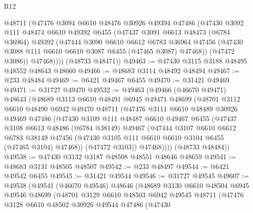 \begin{lexlean}{R12}
\begin{coremodule}
          @48711
          (@47476
            @3094
            @6610
            @48476
            @30926
            @49394
            @47486
            (@47430
              @3092
              @111
              @48474
              @6610
              @49392
              @6455
              (@47437
                @3091
                @6613
                @48473
                (@6784 @36964)
                @49392
                (@47444
                  @3090
                  @6610
                  @6612
                  @6783
                  @36964
                  @47456
                  (@47430 @3088 @111 @6610 @6610 @3087 @6455 (@47465 @3087) @47468))
                (@47472 @3086))
              @47468))))
      (@48733 @48471))
@49463 := @47430 @3115 @3188 @48495 @48552 @48643 @48660
@49466 := @48683 @3114 @48492 @48494
@49467 := @233 @48484
@49469 := @6421 @49467 @6455
@49470 := @31421 @49469
@49471 := @31727 @49470
@49532 := @49463
    (@49466
      (@46670 @49471)
      @48643
      (@48689
        @3113
        @6610
        @48491
        @6945
        @49471
        @48699
        (@48701
          @3112
          @6610
          @48490
          @6942
          @49470
          @48711
          (@47476
            @3111
            @6610
            @48489
            @30926
            @49469
            @47486
            (@47430
              @3109
              @111
              @48487
              @6610
              @49467
              @6455
              (@47437
                @3108
                @6613
                @48486
                (@6784 @38149)
                @49467
                (@47444
                  @3107
                  @6610
                  @6612
                  @6783
                  @38149
                  @47456
                  (@47430 @3105 @111 @6610 @6610 @3104 @6455 (@47465 @3104) @47468))
                (@47472 @3103))
              @47468))))
      (@48733 @48484))
@49538 := @47430 @3132 @3187 @48508 @48551 @48646 @48659
@49541 := @48683 @3131 @48505 @48507
@49542 := @233 @48497
@49544 := @6421 @49542 @6455
@49545 := @31421 @49544
@49546 := @31727 @49545
@49607 := @49538
    (@49541
      (@46670 @49546)
      @48646
      (@48689
        @3130
        @6610
        @48504
        @6945
        @49546
        @48699
        (@48701
          @3129
          @6610
          @48503
          @6942
          @49545
          @48711
          (@47476
            @3128
            @6610
            @48502
            @30926
            @49544
            @47486
            (@47430

\end{coremodule}
\end{lexlean}
